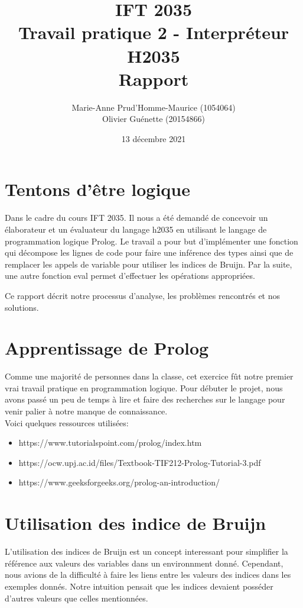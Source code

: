 \documentclass[12pt, letterpaper]{article}
\title{IFT 2035 \\ Travail pratique 2 - Interpréteur H2035 \\ Rapport }
\author{ Marie-Anne Prud'Homme-Maurice (1054064) 
\\ Olivier Guénette (20154866)}
\date{13 décembre 2021}
\begin{document}
\maketitle

\section*{Tentons d'être logique} 

Dans le cadre du cours IFT 2035. Il nous a été demandé de concevoir un 
élaborateur et un évaluateur du langage h2035 en utilisant le langage 
de programmation logique Prolog. Le travail a pour but d'implémenter une 
fonction qui décompose les lignes de code pour faire une inférence des types
ainsi que de remplacer les appels de variable pour utiliser les indices de 
Bruijn. Par la suite, une autre fonction eval permet d'effectuer les opérations 
appropriées.

Ce rapport décrit notre processus d'analyse, les problèmes rencontrés et nos
solutions.

\section*{Apprentissage de Prolog}

Comme une majorité de personnes dans la classe, cet exercice fût notre premier
vrai travail pratique en programmation logique. Pour débuter le projet, nous 
avons passé un peu de temps à lire et faire des recherches sur le langage 
pour venir palier à notre manque de connaissance.\\

Voici quelques ressources utilisées: 
\begin{itemize}
    \item https://www.tutorialspoint.com/prolog/index.htm
    \item https://ocw.upj.ac.id/files/Textbook-TIF212-Prolog-Tutorial-3.pdf
    \item https://www.geeksforgeeks.org/prolog-an-introduction/
\end{itemize}

\section*{Utilisation des indice de Bruijn}

L'utilisation des indices de Bruijn est un concept interessant pour simplifier
la référence aux valeurs des variables dans un environnment donné. Cependant, 
nous avions de la difficulté à faire les liens entre les valeurs des indices 
dans les exemples donnés. Notre intuition pensait que les indices devaient 
posséder d'autres valeurs que celles mentionnées.
\end{document}
